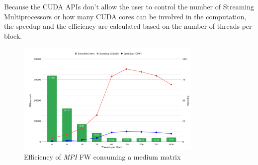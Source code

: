 Because the CUDA APIs don't allow the user to control the number of Streaming Multiprocessors or how many CUDA cores
can be involved in the computation, the speedup and the efficiency are calculated based on the number of threads per block.


\begin{figure}[h!]
\centering                                                                        
\includegraphics[width=3.5in]{diagrams/cuda-time}
\captionsetup{justification=centering}                                                                                                                                   
\caption{Efficiency of \emph{MPI} FW consuming a medium matrix}                                                                                                                                            
\label{fig:cuda-time}                                                                                                                                                           
\end{figure}

